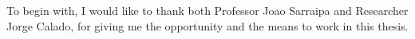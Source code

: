 \acknowledgements

 To begin with, I would like to thank both Professor Joao Sarraipa and Researcher Jorge Calado, for giving me the opportunity and the means to work in this thesis.



